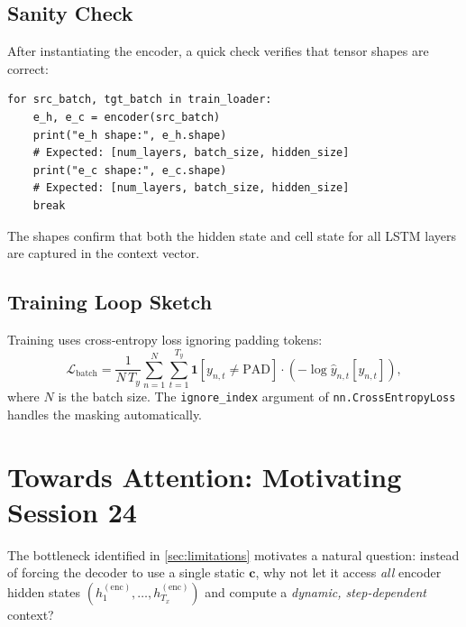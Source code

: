 \documentclass[12pt,a4paper]{article}
\begin{document}
\subsection{Sanity Check}

After instantiating the encoder, a quick check verifies that tensor shapes are correct:

\begin{tcolorbox}[colback=gray!5!white,colframe=gray!60!black,title=Shape Sanity Check]
\begin{verbatim}
for src_batch, tgt_batch in train_loader:
    e_h, e_c = encoder(src_batch)
    print("e_h shape:", e_h.shape)
    # Expected: [num_layers, batch_size, hidden_size]
    print("e_c shape:", e_c.shape)
    # Expected: [num_layers, batch_size, hidden_size]
    break
\end{verbatim}
\end{tcolorbox}

The shapes confirm that both the hidden state and cell state for all LSTM layers are captured in
the context vector.

\subsection{Training Loop Sketch}

Training uses cross-entropy loss ignoring padding tokens:
\begin{equation}
  \mathcal{L}_{\text{batch}} = \frac{1}{N\,T_y}
    \sum_{n=1}^{N}\sum_{t=1}^{T_y}
    \mathbf{1}[y_{n,t} \neq \text{PAD}]\cdot
    \left(-\log \hat{y}_{n,t}[y_{n,t}]\right),
  \label{eq:masked_loss}
\end{equation}
where $N$ is the batch size. The \texttt{ignore\_index} argument of
\texttt{nn.CrossEntropyLoss} handles the masking automatically.

\section{Towards Attention: Motivating Session 24}
\label{sec:towards_attention}

The bottleneck identified in \cref{sec:limitations} motivates a natural question: instead of
forcing the decoder to use a single static $\mathbf{c}$, why not let it access \emph{all}
encoder hidden states $(h_1^{(\text{enc})}, \ldots, h_{T_x}^{(\text{enc})})$ and compute a
\emph{dynamic, step-dependent} context?
\end{document}
